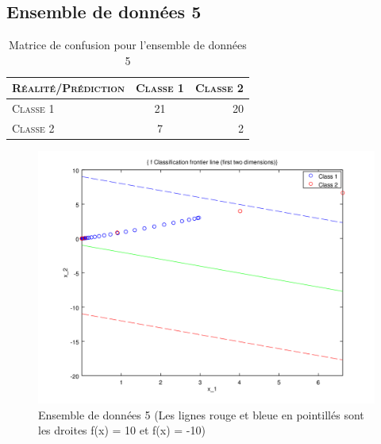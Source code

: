 \documentclass{article}
\begin{document}
\subsection{Ensemble de données 5}

     \begin{table}[H]
       \caption{Matrice de confusion pour l'ensemble de données 5}
       \begin{tabular}{|l|c|r|}
         \hline
         \textsc{Réalité/Prédiction} & \textsc{Classe 1} & \textsc{Classe 2}\\
         \hline
         \textsc{Classe 1} & 21 & 20\\
         \hline
         \textsc{Classe 2} & 7 & 2\\
         \hline
       \end{tabular}
     \end{table}

         \begin{figure}[H]
           \begin{center}
             \includegraphics[scale=0.5]{images/line55.png}
             \caption{Ensemble de données 5 (Les lignes rouge et bleue en pointillés sont les droites f(x) = 10 et f(x) = -10)}
           \end{center}
         \end{figure}
\end{document}
